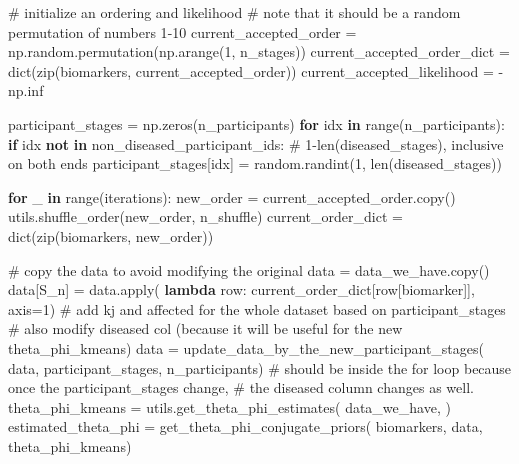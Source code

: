 \documentclass[
  letterpaper,
  DIV=11,
  numbers=noendperiod]{scrreprt}
\newenvironment{Shaded}{\begin{snugshade}}{\end{snugshade}}
\newcommand{\BuiltInTok}[1]{\textcolor[rgb]{0.00,0.23,0.31}{#1}}
\newcommand{\CommentTok}[1]{\textcolor[rgb]{0.37,0.37,0.37}{#1}}
\newcommand{\ControlFlowTok}[1]{\textcolor[rgb]{0.00,0.23,0.31}{\textbf{#1}}}
\newcommand{\DecValTok}[1]{\textcolor[rgb]{0.68,0.00,0.00}{#1}}
\newcommand{\KeywordTok}[1]{\textcolor[rgb]{0.00,0.23,0.31}{\textbf{#1}}}
\newcommand{\NormalTok}[1]{\textcolor[rgb]{0.00,0.23,0.31}{#1}}
\newcommand{\OperatorTok}[1]{\textcolor[rgb]{0.37,0.37,0.37}{#1}}
\newcommand{\StringTok}[1]{\textcolor[rgb]{0.13,0.47,0.30}{#1}}
\begin{document}
\begin{Shaded}
\begin{Highlighting}[]
    \CommentTok{\# initialize an ordering and likelihood}
    \CommentTok{\# note that it should be a random permutation of numbers 1{-}10}
\NormalTok{    current\_accepted\_order }\OperatorTok{=}\NormalTok{ np.random.permutation(np.arange(}\DecValTok{1}\NormalTok{, n\_stages))}
\NormalTok{    current\_accepted\_order\_dict }\OperatorTok{=} \BuiltInTok{dict}\NormalTok{(}\BuiltInTok{zip}\NormalTok{(biomarkers, current\_accepted\_order))}
\NormalTok{    current\_accepted\_likelihood }\OperatorTok{=} \OperatorTok{{-}}\NormalTok{np.inf}

\NormalTok{    participant\_stages }\OperatorTok{=}\NormalTok{ np.zeros(n\_participants)}
    \ControlFlowTok{for}\NormalTok{ idx }\KeywordTok{in} \BuiltInTok{range}\NormalTok{(n\_participants):}
        \ControlFlowTok{if}\NormalTok{ idx }\KeywordTok{not} \KeywordTok{in}\NormalTok{ non\_diseased\_participant\_ids:}
            \CommentTok{\# 1{-}len(diseased\_stages), inclusive on both ends}
\NormalTok{            participant\_stages[idx] }\OperatorTok{=}\NormalTok{ random.randint(}\DecValTok{1}\NormalTok{, }\BuiltInTok{len}\NormalTok{(diseased\_stages))}

    \ControlFlowTok{for}\NormalTok{ \_ }\KeywordTok{in} \BuiltInTok{range}\NormalTok{(iterations):}
\NormalTok{        new\_order }\OperatorTok{=}\NormalTok{ current\_accepted\_order.copy()}
\NormalTok{        utils.shuffle\_order(new\_order, n\_shuffle)}
\NormalTok{        current\_order\_dict }\OperatorTok{=} \BuiltInTok{dict}\NormalTok{(}\BuiltInTok{zip}\NormalTok{(biomarkers, new\_order))}

        \CommentTok{\# copy the data to avoid modifying the original}
\NormalTok{        data }\OperatorTok{=}\NormalTok{ data\_we\_have.copy()}
\NormalTok{        data[}\StringTok{\textquotesingle{}S\_n\textquotesingle{}}\NormalTok{] }\OperatorTok{=}\NormalTok{ data.}\BuiltInTok{apply}\NormalTok{(}
            \KeywordTok{lambda}\NormalTok{ row: current\_order\_dict[row[}\StringTok{\textquotesingle{}biomarker\textquotesingle{}}\NormalTok{]], axis}\OperatorTok{=}\DecValTok{1}\NormalTok{)}
        \CommentTok{\# add kj and affected for the whole dataset based on participant\_stages}
        \CommentTok{\# also modify diseased col (because it will be useful for the new theta\_phi\_kmeans)}
\NormalTok{        data }\OperatorTok{=}\NormalTok{ update\_data\_by\_the\_new\_participant\_stages(}
\NormalTok{            data, participant\_stages, n\_participants)}
        \CommentTok{\# should be inside the for loop because once the participant\_stages change, }
        \CommentTok{\# the diseased column changes as well. }
\NormalTok{        theta\_phi\_kmeans }\OperatorTok{=}\NormalTok{ utils.get\_theta\_phi\_estimates(}
\NormalTok{            data\_we\_have,}
\NormalTok{        )}
\NormalTok{        estimated\_theta\_phi }\OperatorTok{=}\NormalTok{ get\_theta\_phi\_conjugate\_priors(}
\NormalTok{            biomarkers, data, theta\_phi\_kmeans)}


\end{Highlighting}
\end{Shaded}
\end{document}
